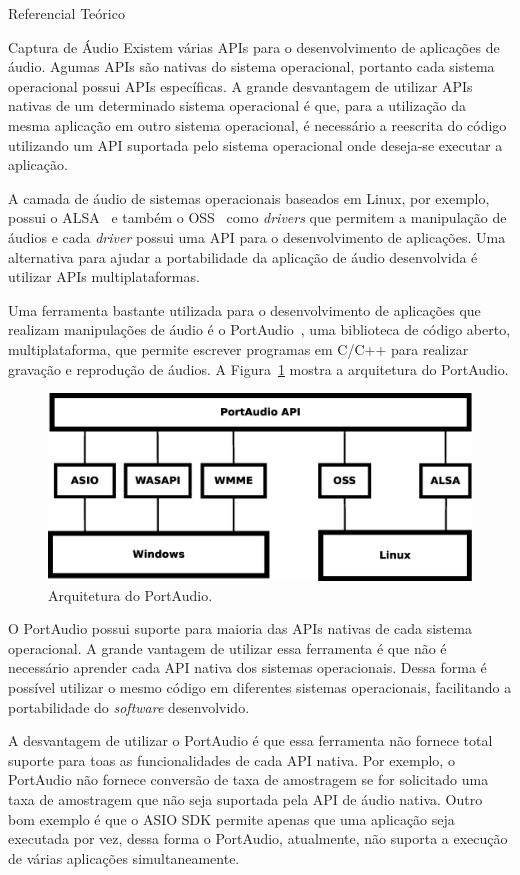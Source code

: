 \begin{chapter}{Referencial Teórico}
\begin{section}{Captura de Áudio}
Existem várias APIs para o desenvolvimento de aplicações de áudio. Agumas APIs são
nativas do sistema operacional, portanto cada sistema operacional possui APIs
específicas. A grande desvantagem de utilizar APIs nativas de um determinado
sistema operacional é que, para a utilização da mesma aplicação em outro sistema
operacional, é necessário a reescrita do código utilizando um API suportada pelo
sistema operacional onde deseja-se executar a aplicação. 

A camada de áudio de sistemas operacionais baseados em Linux, por
exemplo, possui o ALSA~\cite{alsa} e também o OSS~\cite{oss} como
\textit{drivers} que permitem a manipulação de áudios e cada \textit{driver}
possui uma API para o desenvolvimento de aplicações. Uma alternativa para ajudar
a portabilidade da aplicação de áudio desenvolvida é utilizar APIs
multiplataformas.

Uma ferramenta bastante utilizada para o desenvolvimento de aplicações que
realizam manipulações de áudio é o PortAudio~\cite{portaudio}, uma biblioteca de
código aberto, multiplataforma, que permite escrever programas em C/C++ para
realizar gravação e reprodução de áudios. A Figura~\ref{fig:portaudio} mostra a
arquitetura do PortAudio.

\begin{figure}[!h]
	\centering
	\begin{minipage}[c]{\textwidth}
	\centering
	\includegraphics[width=0.7\linewidth]{fig/portaudio}
	\caption{Arquitetura do PortAudio.}
	\label{fig:portaudio}
	\end{minipage}
\end{figure} 

O PortAudio possui suporte para maioria das APIs nativas de cada sistema
operacional. A grande vantagem de utilizar essa ferramenta é que não é
necessário aprender cada API nativa dos sistemas operacionais. Dessa forma é
possível utilizar o mesmo código em diferentes sistemas operacionais,
facilitando a portabilidade do \textit{software} desenvolvido.

A desvantagem de utilizar o PortAudio é que essa ferramenta não fornece total
suporte para toas as funcionalidades de cada API nativa. Por exemplo, o PortAudio não
fornece conversão de taxa de amostragem se for solicitado uma taxa de amostragem
que não seja suportada pela API de áudio nativa. Outro bom exemplo é que o ASIO
SDK permite apenas que uma aplicação seja executada por vez, dessa forma o
PortAudio, atualmente, não suporta a execução de várias aplicações
simultaneamente.


\end{section}
\end{chapter}
